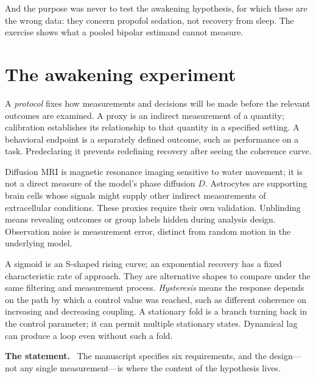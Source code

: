 \documentclass[11pt]{article}
\newcommand{\statement}{\par\smallskip\noindent\textbf{The statement.}\ }
\begin{document}
\noindent
And the purpose was never to test the awakening hypothesis, for which these are
the wrong data: they concern propofol sedation, not recovery from sleep. The
exercise shows what a pooled bipolar estimand cannot measure.

\section{The awakening experiment}

A \emph{protocol} fixes how measurements and decisions will be made before
the relevant outcomes are examined. A proxy is an indirect measurement of a
quantity; calibration establishes its relationship to that quantity in a
specified setting. A behavioral endpoint is a separately defined outcome,
such as performance on a task. Predeclaring it prevents redefining recovery
after seeing the coherence curve.

Diffusion MRI is magnetic resonance imaging sensitive to water movement;
it is not a direct measure of the model's phase diffusion $D$. Astrocytes are
supporting brain cells whose signals might supply other indirect measurements
of extracellular conditions. These proxies require their own validation.
Unblinding means revealing outcomes or group labels hidden during analysis
design. Observation noise is measurement error, distinct from random motion
in the underlying model.

A sigmoid is an S-shaped rising curve; an exponential recovery has a fixed
characteristic rate of approach. They are alternative shapes to compare
under the same filtering and measurement process. \emph{Hysteresis} means the
response depends on the path by which a control value was reached, such as
different coherence on increasing and decreasing coupling. A stationary fold
is a branch turning back in the control parameter; it can permit multiple
stationary states. Dynamical lag can produce a loop even without such a fold.

\statement
The manuscript specifies six requirements, and the design---not any single
measurement---is where the content of the hypothesis lives.
\end{document}
